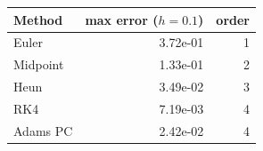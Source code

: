 \begin{tabular}{l r r}\hline
Method & max error ($h=0.1$) & order \\
\hline
Euler & 3.72e-01 & 1 \\
Midpoint & 1.33e-01 & 2 \\
Heun & 3.49e-02 & 3 \\
RK4 & 7.19e-03 & 4 \\
Adams PC & 2.42e-02 & 4 \\
\hline
\end{tabular}
